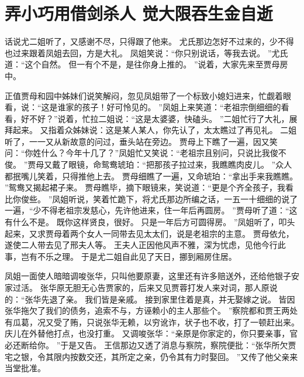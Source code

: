 \chapter{弄小巧用借剑杀人 \quad 觉大限吞生金自逝}
\par
{}\par
话说尤二姐听了，又感谢不尽，只得跟了他来。
尤氏那边怎好不过来的，少不得也过来跟着凤姐去回，方是大礼。
凤姐笑说：“你只别说话，等我去说。
”尤氏道：“这个自然。
但一有个不是，是往你身上推的。
”说着，大家先来至贾母房中。
\par
正值贾母和园中姊妹们说笑解闷，忽见凤姐带了一个标致小媳妇进来，忙觑着眼看，说：“这是谁家的孩子！好可怜见的。
”凤姐上来笑道：“老祖宗倒细细的看看，好不好？”说着，忙拉二姐说：“这是太婆婆，快磕头。
”二姐忙行了大礼，展拜起来。
又指着众姊妹说：这是某人某人，你先认了，太太瞧过了再见礼。
二姐听了，一一又从新故意的问过，垂头站在旁边。
贾母上下瞧了一遍，因又笑问：“你姓什么？今年十几了？”凤姐忙又笑说：“老祖宗且别问，只说比我俊不俊。
”贾母又戴了眼镜，命鸳鸯琥珀：“把那孩子拉过来，我瞧瞧肉皮儿。
”众人都抿嘴儿笑着，只得推他上去。
贾母细瞧了一遍，又命琥珀：“拿出手来我瞧瞧。
”鸳鸯又揭起裙子来。
贾母瞧毕，摘下眼镜来，笑说道：“更是个齐全孩子，我看比你俊些。
”凤姐听说，笑着忙跪下，将尤氏那边所编之话，一五一十细细的说了一遍，“少不得老祖宗发慈心，先许他进来，住一年后再圆房。
”贾母听了道：“这有什么不是。
既你这样贤良，很好。
只是一年后方可圆得房。
”凤姐听了，叩头起来，又求贾母着两个女人一同带去见太太们，说是老祖宗的主意。
贾母依允，遂使二人带去见了邢夫人等。
王夫人正因他风声不雅，深为忧虑，见他今行此事，岂有不乐之理。
于是尤二姐自此见了天日，挪到厢房住居。
\par
凤姐一面使人暗暗调唆张华，只叫他要原妻，这里还有许多赔送外，还给他银子安家过活。
张华原无胆无心告贾家的，后来又见贾蓉打发人来对词，那人原说的：“张华先退了亲。
我们皆是亲戚。
接到家里住着是真，并无娶嫁之说。
皆因张华拖欠了我们的债务，追索不与，方诬赖小的主人那些个。
”察院都和贾王两处有瓜葛，况又受了贿，只说张华无赖，以穷讹诈，状子也不收，打了一顿赶出来。
庆儿在外替他打点，也没打重。
又调唆张华：“亲原是你家定的，你只要亲事，官必还断给你。
”于是又告。
王信那边又透了消息与察院，察院便批：“张华所欠贾宅之银，令其限内按数交还，其所定之亲，仍令其有力时娶回。
”又传了他父亲来当堂批准。
